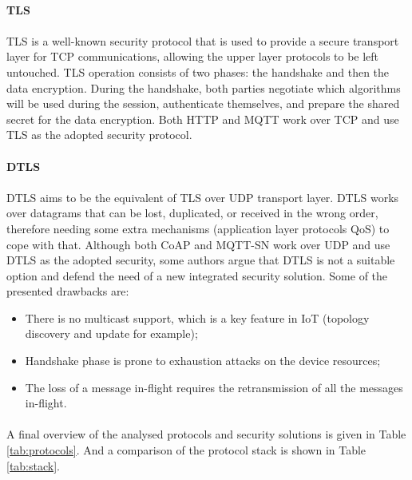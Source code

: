 \paragraph{\textbf{\gls{TLS}}}
\paragraph{}
	\gls{TLS} is a well-known security protocol that is used to provide a secure transport layer for \gls{TCP} communications, allowing the upper layer protocols to be left untouched. \gls{TLS} operation consists of two phases: the handshake and then the data encryption. During the handshake, both parties negotiate which algorithms will be used during the session, authenticate themselves, and prepare the shared secret for the data encryption.
	Both \gls{HTTP} and \gls{MQTT} work over \gls{TCP} and use \gls{TLS} as the adopted security protocol.

\paragraph{\textbf{\gls{DTLS}}}
\paragraph{}
	\gls{DTLS} aims to be the equivalent of \gls{TLS} over \gls{UDP} transport layer. \gls{DTLS} works over datagrams that can be lost, duplicated, or received in the wrong order, therefore needing some extra mechanisms (application layer protocols \gls{QoS}) to cope with that. Although both \gls{CoAP} and \gls{MQTT-SN} work over \gls{UDP} and use \gls{DTLS} as the adopted security, some authors argue that \gls{DTLS} is not a suitable option \cite{Alghamdi2013} and defend the need of a new integrated security solution. Some of the presented drawbacks are:

\begin{itemize}
	\item There is no multicast support, which is a key feature in \gls{IoT} (topology discovery and update for example);\\
	\item Handshake phase is prone to exhaustion attacks on the device resources;\\
	\item The loss of a message in-flight requires the retransmission of all the messages in-flight.
\end{itemize}

\paragraph{}
	A final overview of the analysed protocols and security solutions is given in Table \ref{tab:protocols}. And a comparison of the protocol stack is shown in Table \ref{tab:stack}. 

